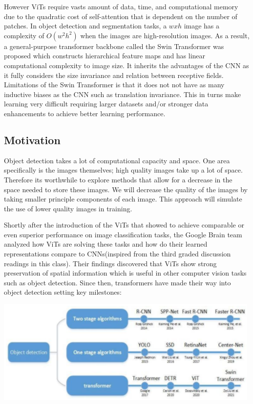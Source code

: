 \documentclass[10pt,twocolumn,letterpaper]{article}
\begin{document}
However ViTs require vasts amount of data, time, and computational memory due to the quadratic cost of self-attention that is dependent on the number of patches. In object detection and segmentation tasks, a $wxh$ image has a complexity of $O(w^2h^2)$ when the images are high-resolution images. As a result, a general-purpose transformer backbone called the Swin Transformer\cite{liu2021swin} was proposed which constructs hierarchical feature maps and has linear computational complexity to image size. It inherits the advantages of the CNN as it fully considers the size invariance and relation between receptive fields. Limitations of the Swin Transformer is that it does not not have as many inductive biases as the CNN such as translation invariance. This in turns make learning very difficult requiring larger datasets and/or stronger data enhancements to achieve better learning performance.

\subsection{Motivation}

Object detection takes a lot of computational capacity and space. One area specifically is the images themselves; high quality images take up a lot of space. Therefore its worthwhile to explore methods that allow for a decrease in the space needed to store these images. We will decrease the quality of the images by taking smaller principle components of each image. This approach will simulate the use of lower quality images in training. 

Shortly after the introduction of the ViTs that showed to achieve comparable or even superior performance on image classification tasks, the Google Brain team analyzed how ViTs are solving these tasks and how do their learned representations compare to CNNs\cite{raghu2021vision}(inspired from the third graded discussion readings in this class). Their findings discovered that ViTs show strong preservation of spatial information which is useful in other computer vision tasks such as object detection. Since then, transformers have made their way into object detection setting key milestones\cite{arkin2021survey}:

\includegraphics[width=0.8\linewidth]{docs/latex/images/brandon/ObjectDetection.png}
\end{document}
